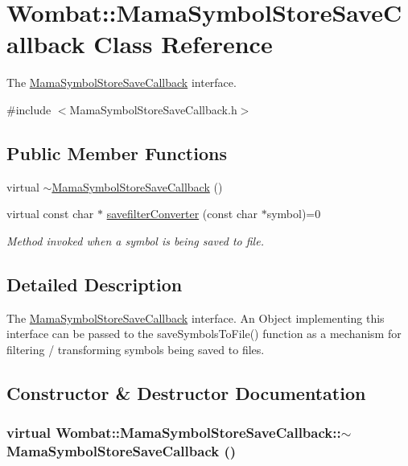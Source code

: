 \hypertarget{classWombat_1_1MamaSymbolStoreSaveCallback}{
\section{Wombat::MamaSymbolStoreSaveCallback Class Reference}
\label{classWombat_1_1MamaSymbolStoreSaveCallback}
}


The \hyperlink{classWombat_1_1MamaSymbolStoreSaveCallback}{MamaSymbolStoreSaveCallback} interface.  


{\ttfamily \#include $<$MamaSymbolStoreSaveCallback.h$>$}\subsection*{Public Member Functions}
\begin{DoxyCompactItemize}
\item 
virtual \hyperlink{classWombat_1_1MamaSymbolStoreSaveCallback_aa740edb093d21ab84af9da49a351a448}{$\sim$MamaSymbolStoreSaveCallback} ()
\item 
virtual const char $\ast$ \hyperlink{classWombat_1_1MamaSymbolStoreSaveCallback_ab723041d8f1937b1c2f348ed98769609}{savefilterConverter} (const char $\ast$symbol)=0
\begin{DoxyCompactList}\small\item\em Method invoked when a symbol is being saved to file. \item\end{DoxyCompactList}\end{DoxyCompactItemize}


\subsection{Detailed Description}
The \hyperlink{classWombat_1_1MamaSymbolStoreSaveCallback}{MamaSymbolStoreSaveCallback} interface. An Object implementing this interface can be passed to the saveSymbolsToFile() function as a mechanism for filtering / transforming symbols being saved to files. 

\subsection{Constructor \& Destructor Documentation}
\hypertarget{classWombat_1_1MamaSymbolStoreSaveCallback_aa740edb093d21ab84af9da49a351a448}{
\subsubsection[{$\sim$MamaSymbolStoreSaveCallback}]{\setlength{\rightskip}{0pt plus 5cm}virtual Wombat::MamaSymbolStoreSaveCallback::$\sim$MamaSymbolStoreSaveCallback ()}}
\label{classWombat_1_1MamaSymbolStoreSaveCallback_aa740edb093d21ab84af9da49a351a448}


